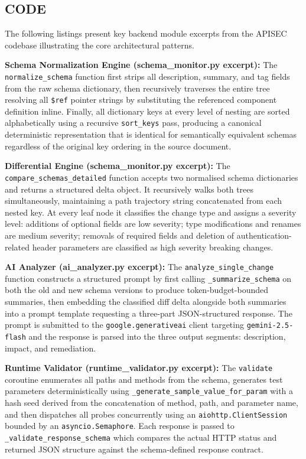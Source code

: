 \documentclass{fisatprojectfinal}
\begin{document}
\newpage
{}
\begin{appendices}
\chapter{CODE}
The following listings present key backend module excerpts from the APISEC codebase illustrating the core architectural patterns.

\textbf{Schema Normalization Engine (schema\_monitor.py excerpt):}
The \texttt{normalize\_schema} function first strips all description, summary, and tag fields from the raw schema dictionary, then recursively traverses the entire tree resolving all \texttt{\$ref} pointer strings by substituting the referenced component definition inline. Finally, all dictionary keys at every level of nesting are sorted alphabetically using a recursive \texttt{sort\_keys} pass, producing a canonical deterministic representation that is identical for semantically equivalent schemas regardless of the original key ordering in the source document.

\textbf{Differential Engine (schema\_monitor.py excerpt):}
The \texttt{compare\_schemas\_detailed} function accepts two normalised schema dictionaries and returns a structured delta object. It recursively walks both trees simultaneously, maintaining a path trajectory string concatenated from each nested key. At every leaf node it classifies the change type and assigns a severity level: additions of optional fields are low severity; type modifications and renames are medium severity; removals of required fields and deletion of authentication-related header parameters are classified as high severity breaking changes.

\textbf{AI Analyzer (ai\_analyzer.py excerpt):}
The \texttt{analyze\_single\_change} function constructs a structured prompt by first calling \texttt{\_summarize\_schema} on both the old and new schema versions to produce token-budget-bounded summaries, then embedding the classified diff delta alongside both summaries into a prompt template requesting a three-part JSON-structured response. The prompt is submitted to the \texttt{google.generativeai} client targeting \texttt{gemini-2.5-flash} and the response is parsed into the three output segments: description, impact, and remediation.

\textbf{Runtime Validator (runtime\_validator.py excerpt):}
The \texttt{validate} coroutine enumerates all paths and methods from the schema, generates test parameters deterministically using \texttt{\_generate\_sample\_value\_for\_param} with a hash seed derived from the concatenation of method, path, and parameter name, and then dispatches all probes concurrently using an \texttt{aiohttp.ClientSession} bounded by an \texttt{asyncio.Semaphore}. Each response is passed to \texttt{\_validate\_response\_schema} which compares the actual HTTP status and returned JSON structure against the schema-defined response contract.


\end{appendices}
\end{document}
